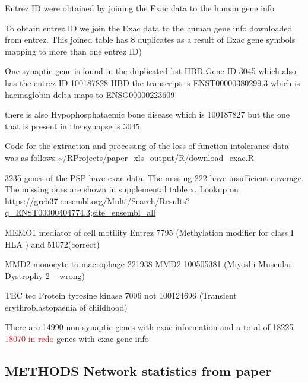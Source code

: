 Entrez ID were obtained by joining the Exac data to the human gene info 




To obtain entrez ID we join the Exac data to the human gene info downloaded from entrez. This joined table has 8 duplicates as a result of Exac gene symbols mapping to more than one entrez ID)

One synaptic gene is found in the duplicated list HBD Gene ID 3045 which also has the entrez ID 100187828 
HBD
the transcript is ENST00000380299.3 which is haemaglobin delta maps to ENSG00000223609

there is also Hypophosphataemic bone disease which is 100187827 but the one that is present in the synapse is 3045


Code for the extraction and processing of the loss of function intolerance data was as follows 
\url{~/RProjects/paper_xls_output/R/download_exac.R}

3235 genes of the PSP have exac data. The missing 222 have insufficient coverage. The missing ones are shown in supplemental table x.
Lookup on \url{https://grch37.ensembl.org/Multi/Search/Results?q=ENST00000404774.3;site=ensembl_all}

MEMO1 mediator of cell motility Entrez 7795 (Methylation modifier for class I HLA
) and 51072(correct)

MMD2 monocyte to macrophage 221938 MMD2 100505381 (Miyoshi Muscular Dystrophy 2 – wrong)

TEC tec Protein tyrosine kinase 7006 not 100124696 (Transient erythroblastopaenia of childhood)

There are 14990 non synaptic genes with exac information and a total of 18225 \textcolor{red}{18070 in redo} genes with exac gene info



\subsection{METHODS Network statistics from paper}
\label{sec: network statistics from paper}

